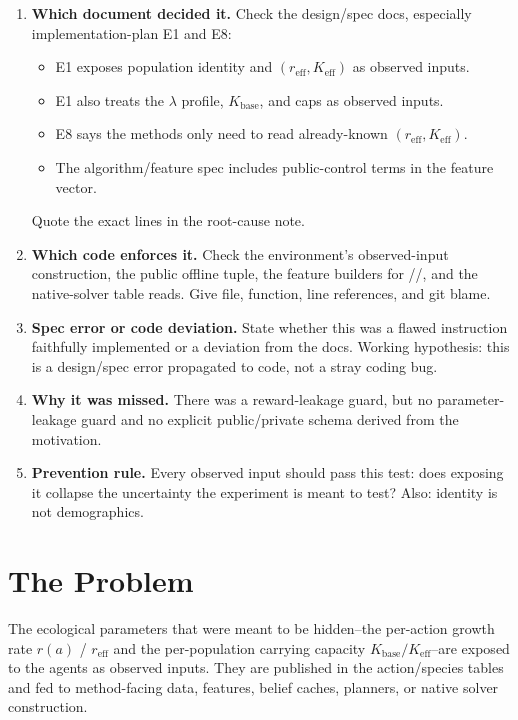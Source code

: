 \documentclass[11pt]{article}
\newcommand{\code}[1]{\texttt{\detokenize{#1}}}
\newcommand{\Kbase}{K_{\mathrm{base}}}
\newcommand{\Keff}{K_{\mathrm{eff}}}
\newcommand{\reff}{r_{\mathrm{eff}}}
\begin{document}
\begin{enumerate}
  \item \textbf{Which document decided it.} Check the design/spec docs,
  especially implementation-plan E1 and E8:
  \begin{itemize}
    \item E1 exposes population identity and \((\reff,\Keff)\) as observed
    inputs.
    \item E1 also treats the \(\lambda\) profile, \(\Kbase\), and caps as
    observed inputs.
    \item E8 says the methods only need to read already-known
    \((\reff,\Keff)\).
    \item The algorithm/feature spec includes public-control terms in the
    feature vector.
  \end{itemize}
  Quote the exact lines in the root-cause note.

  \item \textbf{Which code enforces it.} Check the environment's observed-input
  construction, the public offline tuple, the feature builders for
  \code{refplan}/\code{bamcts}/\code{ogsrl}, and the native-solver table reads.
  Give file, function, line references, and git blame.

  \item \textbf{Spec error or code deviation.} State whether this was a flawed
  instruction faithfully implemented or a deviation from the docs. Working
  hypothesis: this is a design/spec error propagated to code, not a stray coding
  bug.

  \item \textbf{Why it was missed.} There was a reward-leakage guard, but no
  parameter-leakage guard and no explicit public/private schema derived from the
  motivation.

  \item \textbf{Prevention rule.} Every observed input should pass this test:
  does exposing it collapse the uncertainty the experiment is meant to test?
  Also: identity is not demographics.
\end{enumerate}

\section{The Problem}

The ecological parameters that were meant to be hidden--the per-action growth
rate \(r(a)\) / \(\reff\) and the per-population carrying capacity
\(\Kbase/\Keff\)--are exposed to the agents as observed inputs. They are
published in the action/species tables and fed to method-facing data, features,
belief caches, planners, or native solver construction.
\end{document}
